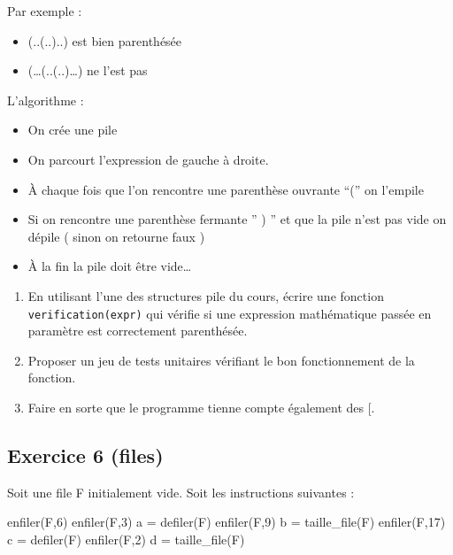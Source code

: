\documentclass[
  a4paper,
  DIV=11,
  numbers=noendperiod]{scrartcl}
\newenvironment{Shaded}{\begin{snugshade}}{\end{snugshade}}
\newcommand{\DecValTok}[1]{\textcolor[rgb]{0.68,0.00,0.00}{#1}}
\newcommand{\NormalTok}[1]{\textcolor[rgb]{0.00,0.23,0.31}{#1}}
\newcommand{\OperatorTok}[1]{\textcolor[rgb]{0.37,0.37,0.37}{#1}}
\providecommand{\tightlist}{%
  \setlength{\itemsep}{0pt}\setlength{\parskip}{0pt}}\usepackage{longtable,booktabs,array}
\begin{document}
Par exemple :

\begin{itemize}
\tightlist
\item
  (..(..)..) est bien parenthésée
\item
  (\ldots(..(..)\ldots) ne l'est pas
\end{itemize}

L'algorithme :

\begin{itemize}
\tightlist
\item
  On crée une pile
\item
  On parcourt l'expression de gauche à droite.
\item
  À chaque fois que l'on rencontre une parenthèse ouvrante ``('' on
  l'empile
\item
  Si on rencontre une parenthèse fermante '' ) '' et que la pile n'est
  pas vide on dépile ( sinon on retourne faux )
\item
  À la fin la pile doit être vide\ldots{}
\end{itemize}

\begin{enumerate}
\def\labelenumi{\arabic{enumi}.}
\tightlist
\item
  En utilisant l'une des structures pile du cours, écrire une fonction
  \texttt{verification(expr)} qui vérifie si une expression mathématique
  passée en paramètre est correctement parenthésée.
\item
  Proposer un jeu de tests unitaires vérifiant le bon fonctionnement de
  la fonction.
\item
  Faire en sorte que le programme tienne compte également des {[}.
\end{enumerate}

\hypertarget{fa-solid-pencil-alt-exercice-6-files}{%
\subsection{\texorpdfstring{ Exercice 6
(files)}{ Exercice 6 (files)}}\label{fa-solid-pencil-alt-exercice-6-files}}

Soit une file F initialement vide. Soit les instructions suivantes :

\begin{Shaded}
\begin{Highlighting}[]
\NormalTok{enfiler(F,}\DecValTok{6}\NormalTok{)}
\NormalTok{enfiler(F,}\DecValTok{3}\NormalTok{)}
\NormalTok{a }\OperatorTok{=}\NormalTok{ defiler(F)}
\NormalTok{enfiler(F,}\DecValTok{9}\NormalTok{)}
\NormalTok{b }\OperatorTok{=}\NormalTok{ taille\_file(F)}
\NormalTok{enfiler(F,}\DecValTok{17}\NormalTok{)}
\NormalTok{c }\OperatorTok{=}\NormalTok{ defiler(F)}
\NormalTok{enfiler(F,}\DecValTok{2}\NormalTok{)}
\NormalTok{d }\OperatorTok{=}\NormalTok{ taille\_file(F)}
\end{Highlighting}
\end{Shaded}
\end{document}
